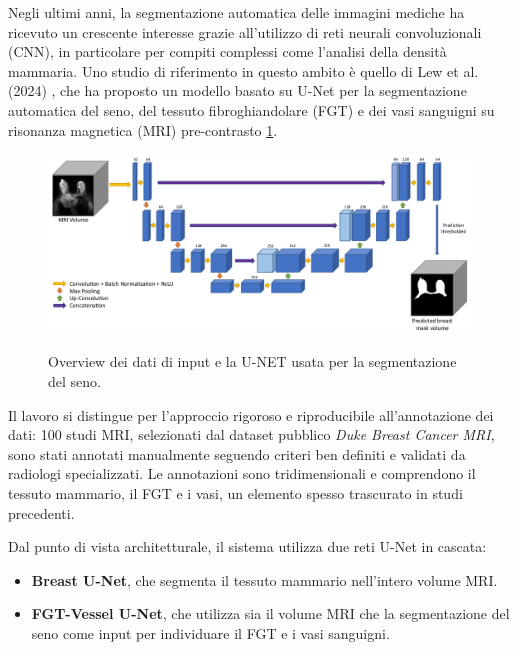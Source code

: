 Negli ultimi anni, la segmentazione automatica delle immagini mediche ha ricevuto un crescente interesse grazie all’utilizzo di reti neurali convoluzionali (CNN), in particolare per compiti complessi come l’analisi della densità mammaria. Uno studio di riferimento in questo ambito è quello di Lew et al. (2024) \cite{lew2024segmentation}, che ha proposto un modello basato su U-Net per la segmentazione automatica del seno, del tessuto fibroghiandolare (FGT) e dei vasi sanguigni su risonanza magnetica (MRI) pre-contrasto \ref{fig:schema_segmentazione_seno_paper}.

\begin{figure}[H] 
  	\centering 
 	\includegraphics[width=\textwidth]{images/2025-07-07-12-01-04.png} 
    \label{fig:schema_segmentazione_seno_paper}
	\caption{Overview dei dati di input e la U-NET usata per la segmentazione del seno.}
 \end{figure} 

Il lavoro si distingue per l’approccio rigoroso e riproducibile all’annotazione dei dati: 100 studi MRI, selezionati dal dataset pubblico \textit{Duke Breast Cancer MRI}, sono stati annotati manualmente seguendo criteri ben definiti e validati da radiologi specializzati. Le annotazioni sono tridimensionali e comprendono il tessuto mammario, il FGT e i vasi, un elemento spesso trascurato in studi precedenti.

Dal punto di vista architetturale, il sistema utilizza due reti U-Net in cascata:
\begin{itemize}
\item \textbf{Breast U-Net}, che segmenta il tessuto mammario nell’intero volume MRI.
\item \textbf{FGT-Vessel U-Net}, che utilizza sia il volume MRI che la segmentazione del seno come input per individuare il FGT e i vasi sanguigni.
\end{itemize}

